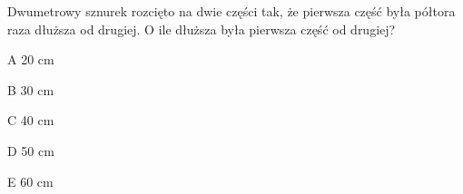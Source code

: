 \begin{tresc}
Dwumetrowy sznurek rozcięto na dwie części tak, że pierwsza część była półtora raza dłuższa od drugiej. O ile dłuższa była pierwsza część od drugiej?
\end{tresc}
\begin{wariant}{A} 20 cm \end{wariant}
\begin{wariant}{B} 30 cm \end{wariant}
\begin{wariant}{C} 40 cm \end{wariant}
\begin{wariant}{D} 50 cm \end{wariant}
\begin{wariant}{E} 60 cm \end{wariant}
